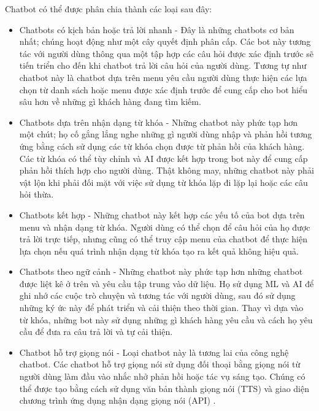 Chatbot có thể được phân chia thành các loại sau đây:
\begin{itemize}
    \item Chatbots có kịch bản hoặc trả lời nhanh - Đây là những chatbots cơ bản nhất; chúng hoạt động như một cây quyết định phân cấp. Các bot này tương tác với người dùng thông qua một tập hợp các câu hỏi được xác định trước sẽ tiến triển cho đến khi chatbot trả lời câu hỏi của người dùng. Tương tự như chatbot này là chatbot dựa trên menu yêu cầu người dùng thực hiện các lựa chọn từ danh sách hoặc menu được xác định trước để cung cấp cho bot hiểu sâu hơn về những gì khách hàng đang tìm kiếm.

    \item Chatbots dựa trên nhận dạng từ khóa - Những chatbot này phức tạp hơn một chút; họ cố gắng lắng nghe những gì người dùng nhập và phản hồi tương ứng bằng cách sử dụng các từ khóa chọn được từ phản hồi của khách hàng. Các từ khóa có thể tùy chỉnh và AI được kết hợp trong bot này để cung cấp phản hồi thích hợp cho người dùng. Thật không may, những chatbot này phải vật lộn khi phải đối mặt với việc sử dụng từ khóa lặp đi lặp lại hoặc các câu hỏi thừa.

    \item Chatbots kết hợp - Những chatbot này kết hợp các yếu tố của bot dựa trên menu và nhận dạng từ khóa. Người dùng có thể chọn để câu hỏi của họ được trả lời trực tiếp, nhưng cũng có thể truy cập menu của chatbot để thực hiện lựa chọn nếu quá trình nhận dạng từ khóa tạo ra kết quả không hiệu quả.

    \item Chatbots theo ngữ cảnh - Những chatbot này phức tạp hơn những chatbot được liệt kê ở trên và yêu cầu tập trung vào dữ liệu. Họ sử dụng ML và AI để ghi nhớ các cuộc trò chuyện và tương tác với người dùng, sau đó sử dụng những ký ức này để phát triển và cải thiện theo thời gian. Thay vì dựa vào từ khóa, những bot này sử dụng những gì khách hàng yêu cầu và cách họ yêu cầu để đưa ra câu trả lời và tự cải thiện.

    \item Chatbot hỗ trợ giọng nói - Loại chatbot này là tương lai của công nghệ chatbot. Các chatbot hỗ trợ giọng nói sử dụng đối thoại bằng giọng nói từ người dùng làm đầu vào nhắc nhở phản hồi hoặc tác vụ sáng tạo. Chúng có thể được tạo bằng cách sử dụng văn bản thành giọng nói (TTS) và giao diện chương trình ứng dụng nhận dạng giọng nói (API) \cite{chat-bot}.

\end{itemize}
